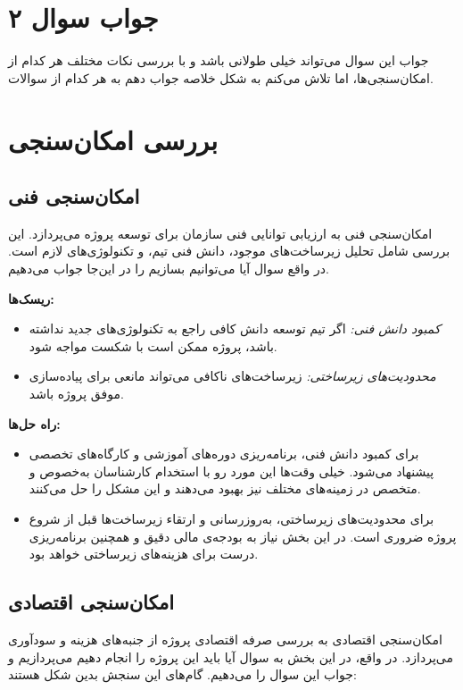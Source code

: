 \section*{جواب سوال ۲}

جواب این سوال می‌تواند خیلی طولانی باشد و با بررسی نکات مختلف هر کدام از امکان‌سنجی‌ها، اما تلاش می‌کنم به شکل خلاصه جواب دهم به هر کدام از سوالات.

\section{بررسی امکان‌سنجی}
\subsection{امکان‌سنجی فنی}
امکان‌سنجی فنی به ارزیابی توانایی فنی سازمان برای توسعه پروژه می‌پردازد. این بررسی شامل تحلیل زیرساخت‌های موجود، دانش فنی تیم، و تکنولوژی‌های لازم است. در واقع سوال آیا می‌توانیم بسازیم را در این‌جا جواب می‌دهیم.

\textbf{ریسک‌ها:}
\begin{itemize}
	\item \textit{کمبود دانش فنی:} اگر تیم توسعه دانش کافی راجع به تکنولوژی‌های جدید نداشته باشد، پروژه ممکن است با شکست مواجه شود.
	\item \textit{محدودیت‌های زیرساختی:} زیرساخت‌های ناکافی می‌تواند مانعی برای پیاده‌سازی موفق پروژه باشد.
\end{itemize}

\textbf{راه حل‌ها:}
\begin{itemize}
	\item برای کمبود دانش فنی، برنامه‌ریزی دوره‌های آموزشی و کارگاه‌های تخصصی پیشنهاد می‌شود.
	خیلی وقت‌ها این مورد رو با استخدام کارشناسان به‌خصوص و متخصص در زمینه‌های مختلف نیز بهبود می‌دهند و این مشکل را حل می‌کنند.
	\item برای محدودیت‌های زیرساختی، به‌روزرسانی و ارتقاء زیرساخت‌ها قبل از شروع پروژه ضروری است.
	در این بخش نیاز به بودجه‌ی مالی دقیق و همچنین برنامه‌ریزی درست برای هزینه‌های زیرساختی خواهد بود.
\end{itemize}

\subsection{امکان‌سنجی اقتصادی}
امکان‌سنجی اقتصادی به بررسی صرفه اقتصادی پروژه از جنبه‌های هزینه و سودآوری می‌پردازد. در واقع، در این بخش به سوال آیا باید این پروژه را انجام دهیم می‌پردازیم و جواب این سوال را می‌دهیم.	 گام‌های این سنجش بدین شکل هستند:

